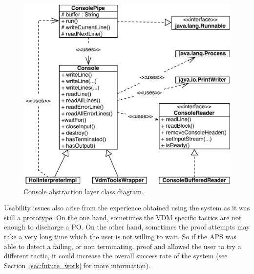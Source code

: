 \documentclass[]{article}
\begin{document}
\begin{figure}
  \begin{center}
    \includegraphics[width=.8\textwidth]{images/aps_console_class_diagram.pdf}
    \caption[Console asbtraction class diagram]{Console abstraction layer class diagram.}
    \label{fig:aps_console_class}
  \end{center}
\end{figure}

Usability issues also arise from the experience obtained using the system as it was still a prototype.
On the one hand, sometimes the VDM specific tactics are not enough to discharge a PO.
On the other hand, sometimes the proof attempts may take a very long time which the user is not willing to wait.
So if the APS was able to detect a failing, or non terminating, proof and allowed the user to try a different tactic, it could increase the overall success rate of the system (see Section~\ref{sec:future_work} for more information).
\end{document}
